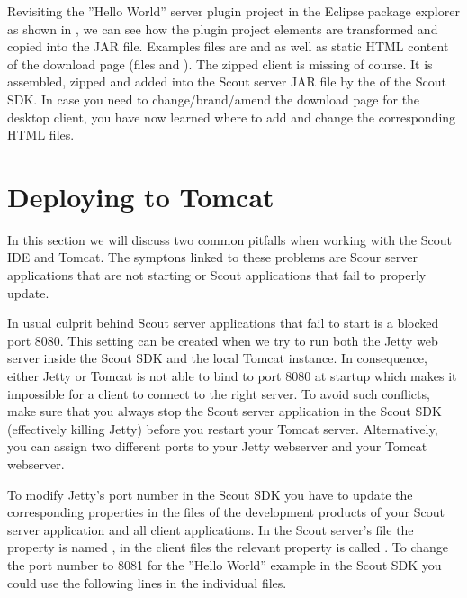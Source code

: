 \documentclass[a4paper,10pt,twoside]{book}
\begin{document}
{Revisiting the ''Hello World'' server plugin project in the Eclipse package explorer as shown in , we can see how the plugin project elements are transformed and copied into the JAR file.
Examples files are  and  as well as static HTML content of the download page (files  and ).
The zipped client is missing of course.
It is assembled, zipped and added into the Scout server JAR file by the  of the Scout SDK.
In case you need to change/brand/amend the download page for the desktop client, you have now learned where to add and change the corresponding HTML files.

\section{Deploying to Tomcat}

In this section we will discuss two common pitfalls when working with the Scout IDE and Tomcat.
The symptons linked to these problems are Scour server applications that are not starting or Scout applications that fail to properly update.

In usual culprit behind Scout server applications that fail to start is a blocked port 8080.
This setting can be created when we try to run both the Jetty web server inside the Scout SDK and the local Tomcat instance.
In consequence, either Jetty or Tomcat is not able to bind to port 8080 at startup which makes it impossible for a client to connect to the right server.
To avoid such conflicts, make sure that you always stop the Scout server application in the Scout SDK (effectively killing Jetty) before you restart your Tomcat server.
Alternatively, you can assign two different ports to your Jetty webserver and your Tomcat webserver.

To modify Jetty's port number in the Scout SDK you have to update the corresponding properties in the  files of the development products of your Scout server application and all client applications.
In the Scout server's  file the property is named , in the client  files the relevant property is called .
To change the port number to 8081 for the ''Hello World'' example in the Scout SDK you could use the following lines in the individual  files.

}
\end{document}
